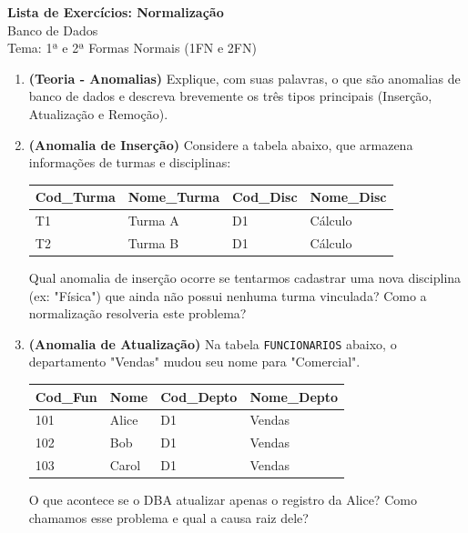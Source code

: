 \documentclass[12pt]{article}
\begin{document}
\vspace*{0.2cm}
\begin{center}
  {\Large \textbf{Lista de Exercícios: Normalização}}\\[0.2cm]
  {\large Banco de Dados}\\[0.2cm]
  Tema: 1ª e 2ª Formas Normais (1FN e 2FN)
\end{center}

\vspace{0.5cm}

\begin{enumerate}[label=\textbf{Questão \arabic*:}, leftmargin=*]

    \item \textbf{(Teoria - Anomalias)} Explique, com suas palavras, o que são anomalias de banco de dados e descreva brevemente os três tipos principais (Inserção, Atualização e Remoção).

    \item \textbf{(Anomalia de Inserção)} Considere a tabela abaixo, que armazena informações de turmas e disciplinas:
    
    \vspace{0.2cm}
    \centering
    \begin{tabular}{|l|l|l|l|}
        \hline
        \textbf{Cod\_Turma} & \textbf{Nome\_Turma} & \textbf{Cod\_Disc} & \textbf{Nome\_Disc} \\ \hline
        T1 & Turma A & D1 & Cálculo \\ \hline
        T2 & Turma B & D1 & Cálculo \\ \hline
    \end{tabular}
    \flushleft
    \vspace{0.2cm}
    Qual anomalia de inserção ocorre se tentarmos cadastrar uma nova disciplina (ex: "Física") que ainda não possui nenhuma turma vinculada? Como a normalização resolveria este problema?

    \item \textbf{(Anomalia de Atualização)} Na tabela \texttt{FUNCIONARIOS} abaixo, o departamento "Vendas" mudou seu nome para "Comercial".
    
    \vspace{0.2cm}
    \centering
    \begin{tabular}{|l|l|l|l|}
        \hline
        \textbf{Cod\_Fun} & \textbf{Nome} & \textbf{Cod\_Depto} & \textbf{Nome\_Depto} \\ \hline
        101 & Alice & D1 & Vendas \\ \hline
        102 & Bob & D1 & Vendas \\ \hline
        103 & Carol & D1 & Vendas \\ \hline
    \end{tabular}
    \flushleft
    \vspace{0.2cm}
    O que acontece se o DBA atualizar apenas o registro da Alice? Como chamamos esse problema e qual a causa raiz dele?


\end{enumerate}
\end{document}
